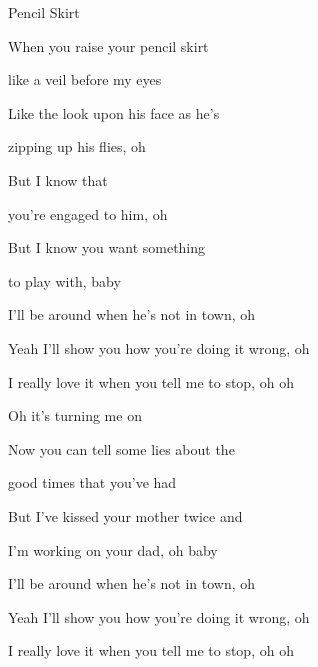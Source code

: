 \begin{song}{Pencil Skirt}{
	
	\chordset[Verse]{ \CMaj \AMaj \DMaj \GMaj }
	\chordset[Chorus]{ \EmShAm \CMajShE \DMajShA \GMajShE}
}

\begin{songverse}
When you raise your pencil skirt 

 like a veil before my eyes

 
 Like the look upon his face as he's

 
 zipping up his flies, oh


 But I know that


 you're engaged to him, oh


\hspace{10pt}But I  know you want something 


to play with, baby

\end{songverse}

\begin{songchorus}

 I'll be around when he's not in town, oh


 Yeah I'll show you how you're doing it wrong, oh 


 I really love it when you tell me to stop, oh oh 
                
 
 Oh it's turning me on

\end{songchorus}

\begin{songverse}

 Now you can tell some lies about the


good times that you've had


But I've kissed your mother twice and


I'm working on your dad, oh baby


\end{songverse}

\begin{songchorus}

 I'll be around when he's not in town, oh 


 Yeah I'll show you how you're doing it wrong, oh 


 I really love it when you tell me to stop, oh oh 
                

\end{songchorus}
\end{song}
